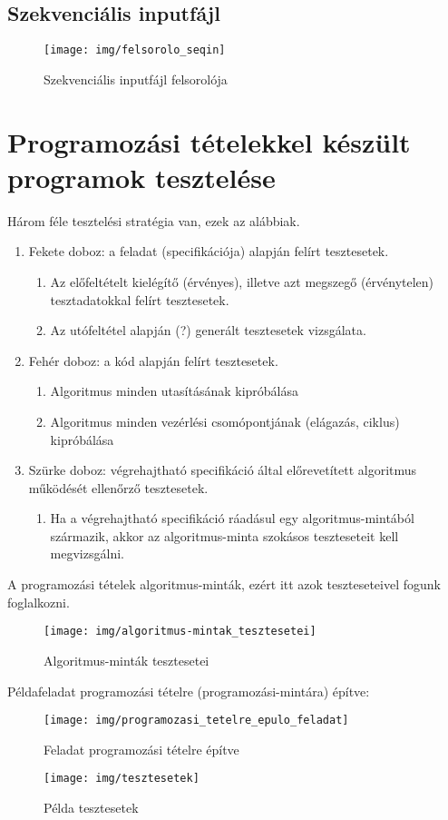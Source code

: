 \documentclass[margin=0px]{article}
\begin{document}
\subsection{Szekvenciális inputfájl}
\begin{figure}[H]
    \centering
    \texttt{[image: img/felsorolo\_seqin]}
    \caption{Szekvenciális inputfájl felsorolója}
    \label{fig:felsorolo_seqin}
\end{figure}

\section{Programozási tételekkel készült programok tesztelése}
Három féle tesztelési stratégia van, ezek az alábbiak.
\begin {enumerate}
	\item Fekete doboz: a feladat (specifikációja) alapján felírt tesztesetek.
		\begin {enumerate}
			\item Az előfeltételt kielégítő (érvényes), illetve azt megszegő (érvénytelen)
tesztadatokkal felírt tesztesetek.
			\item Az utófeltétel alapján (?) generált tesztesetek vizsgálata.
		\end {enumerate}
	\item Fehér doboz: a kód alapján felírt tesztesetek.
		\begin {enumerate}
			\item Algoritmus minden utasításának kipróbálása
			\item Algoritmus minden vezérlési csomópontjának (elágazás, ciklus) kipróbálása
		\end {enumerate}
	\item Szürke doboz: végrehajtható specifikáció által előrevetített algoritmus
működését ellenőrző tesztesetek.
		\begin {enumerate}
			\item Ha a végrehajtható specifikáció ráadásul egy algoritmus-mintából származik,
akkor az algoritmus-minta szokásos teszteseteit kell megvizsgálni.
		\end {enumerate}
\end {enumerate}
A programozási tételek algoritmus-minták, ezért itt azok teszteseteivel fogunk foglalkozni.
\begin{figure}[H]
    \centering
    \texttt{[image: img/algoritmus-mintak\_tesztesetei]}
    \caption{Algoritmus-minták tesztesetei}
    \label{fig:algoritmus-mintak_tesztesetei}
\end{figure}

Példafeladat programozási tételre (programozási-mintára) építve:
\begin{figure}[H]
    \centering
    \texttt{[image: img/programozasi\_tetelre\_epulo\_feladat]}
    \caption{Feladat programozási tételre építve}
    \label{fig:programozasi_tetelre_epulo_feladat}
\end{figure}

\begin{figure}[H]
    \centering
    \texttt{[image: img/tesztesetek]}
    \caption{Példa tesztesetek}
    \label{fig:tesztesetek}
\end{figure}
\end{document}

